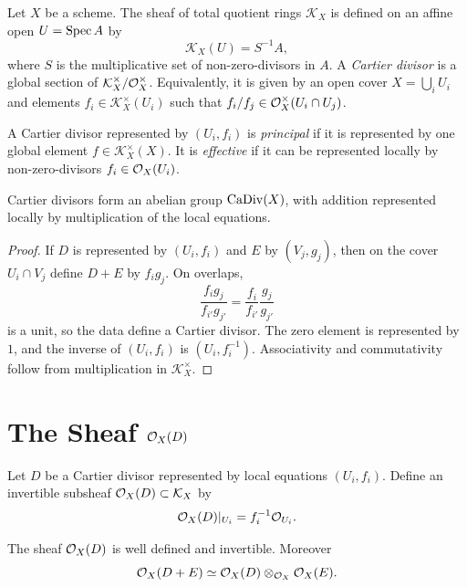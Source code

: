 \begin{definition}
Let \(X\) be a scheme.  The sheaf of total quotient rings \(\mathcal K_X\) is
defined on an affine open \(U=\operatorname{Spec} A\) by
\[
    \mathcal K_X(U)=S^{-1}A,
\]
where \(S\) is the multiplicative set of non-zero-divisors in \(A\).  A
\emph{Cartier divisor} is a global section of
\(\mathcal K_X^\times/\mathcal{O}_X^\times\).  Equivalently, it is given by an open
cover \(X=\bigcup_i U_i\) and elements \(f_i\in\mathcal K_X^\times(U_i)\) such
that \(f_i/f_j\in\mathcal{O}_X^\times(U_i\cap U_j)\).
\end{definition}

\begin{definition}
A Cartier divisor represented by \((U_i,f_i)\) is \emph{principal} if it is
represented by one global element \(f\in\mathcal K_X^\times(X)\).  It is
\emph{effective} if it can be represented locally by non-zero-divisors
\(f_i\in\mathcal{O}_X(U_i)\).
\end{definition}

\begin{proposition}
Cartier divisors form an abelian group \(\operatorname{CaDiv}(X)\), with addition represented
locally by multiplication of the local equations.
\end{proposition}

\begin{proof}
If \(D\) is represented by \((U_i,f_i)\) and \(E\) by \((V_j,g_j)\), then on the
cover \(U_i\cap V_j\) define \(D+E\) by \(f_i g_j\).  On overlaps,
\[
    \frac{f_i g_j}{f_{i'}g_{j'}}
    =
    \frac{f_i}{f_{i'}}\frac{g_j}{g_{j'}}
\]
is a unit, so the data define a Cartier divisor.  The zero element is
represented by \(1\), and the inverse of \((U_i,f_i)\) is \((U_i,f_i^{-1})\).
Associativity and commutativity follow from multiplication in
\(\mathcal K_X^\times\).
\end{proof}

\section{The Sheaf \texorpdfstring{\(\mathcal{O}_X(D)\)}{O(D)}}

\begin{definition}
Let \(D\) be a Cartier divisor represented by local equations
\((U_i,f_i)\).  Define an invertible subsheaf \(\mathcal{O}_X(D)\subset \mathcal K_X\)
by
\[
    \mathcal{O}_X(D)|_{U_i}=f_i^{-1}\mathcal{O}_{U_i}.
\]
\end{definition}

\begin{proposition}
The sheaf \(\mathcal{O}_X(D)\) is well defined and invertible.  Moreover
\[
    \mathcal{O}_X(D+E)\simeq \mathcal{O}_X(D)\otimes_{\mathcal{O}_X}\mathcal{O}_X(E).
\]
\end{proposition}

